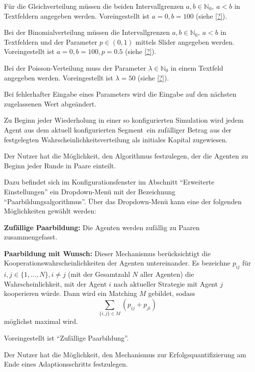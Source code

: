 \documentclass[parskip=full,11pt]{scrartcl}
\def\adapt{Adaptionsschritt}
\def\segment{Segment}
\begin{document}
Für die Gleichverteilung müssen die beiden Intervallgrenzen \(a,b \in \mathbb{N}_0, \ a < b\) in Textfeldern angegeben werden. Voreingestellt ist \(a = 0, b = 100\) (siehe \cref{?}).

Bei der Binomialverteilung müssen die Intervallgrenzen \(a,b \in \mathbb{N}_0, \ a < b\) in Textfeldern und der Parameter \(p \in (0,1)\) mittels Slider angegeben werden. Voreingestellt ist \(a = 0, b = 100, p = 0.5\) (siehe \cref{?}).

Bei der Poisson-Verteilung muss der Parameter \(\lambda \in \mathbb{N}_0\) in einem Textfeld angegeben werden. Voreingestellt ist \(\lambda = 50\) (siehe \cref{?}).

Bei fehlerhafter Eingabe eines Parameters wird die Eingabe auf den nächsten zugelassenen Wert abgeändert.

Zu Beginn jeder Wiederholung in einer so konfigurierten Simulation wird jedem Agent aus dem aktuell konfigurierten \segment\ ein zufälliger Betrag aus der festgelegten Wahrscheinlichkeitsverteilung als initiales Kapital zugewiesen.


Der Nutzer hat die Möglichkeit, den Algorithmus festzulegen, der die Agenten zu Beginn jeder Runde in Paare einteilt.

Dazu befindet sich im Konfigurationsfenster im Abschnitt \enquote{Erweiterte Einstellungen} ein Dropdown-Menü mit der Bezeichnung \enquote{Paarbildungsalgorithmus}. Über das Dropdown-Menü kann eine der folgenden Möglichkeiten gewählt werden:

\textbf{Zufällige Paarbildung:}
Die Agenten werden zufällig zu Paaren zusammengefasst.

\textbf{Paarbildung mit Wunsch:}
Dieser Mechanismus berücksichtigt die Kooperationswahrscheinlichkeiten der Agenten untereinander. Es bezeichne \(p_{ij}\) für \(i,j \in \{1,...,N\}, i \neq j\) (mit der Gesamtzahl \(N\) aller Agenten) die Wahrscheinlichkeit, mit der Agent \(i\) nach aktueller Strategie mit Agent \(j\) kooperieren würde. Dann wird ein Matching \(M\) gebildet, sodass
\[
\sum_{\{i,j\} \in M} \left(p_{ij} + p_{ji}\right)
\]
möglichst maximal wird.

Voreingestellt ist \enquote{Zufällige Paarbildung}.

Der Nutzer hat die Möglichkeit, den Mechanismus zur Erfolgsquantifizierung am Ende eines \adapt s festzulegen.
\end{document}
